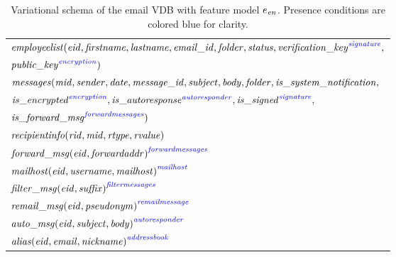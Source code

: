 \begin{table}
\caption[short caption]{Variational schema of the email VDB with feature model 
\ensuremath{\dimMeta_\enron}. 
Presence conditions are colored blue for clarity.
}
\label{tab:enron-vsch}
\centering
\small
\begin{tabular}{| l |}
\hline
$\employees(\eid,\fname,\lname,\emailid,\folder,\status,
 \annot[\fsignature]{\verificationkey},$\\
\hspace{60pt} $  \annot[\fencryption]{\publickey})$ \\
$\messages(\midatt, \sender, \dateatt, \messageid, \subject, \body, \folder,
  \issystemnotification,$\\
\hspace{44pt}  $  \annot[\fencryption]{\isencrypted},
\annot[\fautoresponder]{\isautoresponse},\annot[\fsignature]{\issigned},$\\
\hspace{44pt} $  \annot[\fforwardmsg]{\isforwardmsg})$\\
$\recipientinfo(\rid, \midatt, \rtype, \rvalue)$ \\
${\forwardmsg(\eid, \forwardaddr)}^{\fforwardmsg}$ \\
${\mailhost(\eid, \username, \mailhost)}^{\fmailhost}$\\
${\filtermsg(\eid, \suffix)}^{\ffiltermsg}$\\
${\remailmsg(\eid, \pseudonym)}^{\fremailmsg}$\\
${\automsg(\eid, \subject, \body)}^{\fautoresponder}$\\
${\alias(\eid, \emailAtt, \nickname)}^{\faddressbook}$\\
\hline
\end{tabular}
\end{table}

